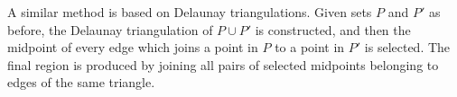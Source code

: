\documentclass[12pt,a4paper]{article}
\begin{document}
A similar method \cite{Avi-04} is based on Delaunay triangulations. Given sets $P$ and $P'$ as before, the Delaunay triangulation of $P \cup P'$ is constructed, and then the midpoint of every edge which joins a point in $P$ to a point in $P'$ is selected. The final region is produced by joining all pairs of selected midpoints belonging to edges of the same triangle.

%
%
%
%
\end{document}
